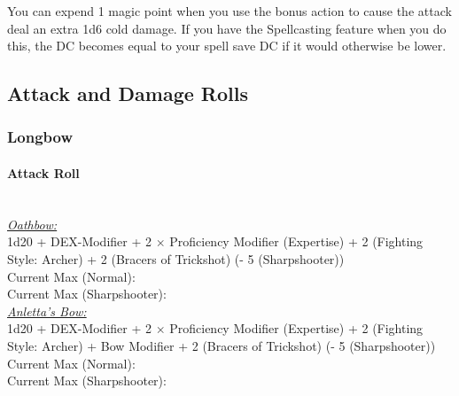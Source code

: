 \documentclass[letterpaper,openany,oneside,twocolumn]{book}
\begin{document}
You can expend 1 magic point when you use the bonus action to cause the attack deal an extra 1d6 cold damage. If you have the Spellcasting feature when you do this, the DC becomes equal to your spell save DC if it would otherwise be lower.

\subsection*{Attack and Damage Rolls}
\subsubsection*{Longbow}
\paragraph*{Attack Roll}\hfill\\
\underline{\textit{Oathbow:}}\\
1d20 + DEX-Modifier + 2 $\times$ Proficiency Modifier (Expertise) + 2 (Fighting Style: Archer) + 2 (Bracers of Trickshot) (- 5 (Sharpshooter)) \\
\indent Current Max (Normal):  \\
\indent Current Max (Sharpshooter):  \\
\underline{\textit{Anletta's Bow:}}\\
1d20 + DEX-Modifier + 2 $\times$ Proficiency Modifier (Expertise) + 2 (Fighting Style: Archer) + Bow Modifier + 2 (Bracers of Trickshot) (- 5 (Sharpshooter)) \\
\indent Current Max (Normal):  \\
\indent Current Max (Sharpshooter): 
\end{document}
